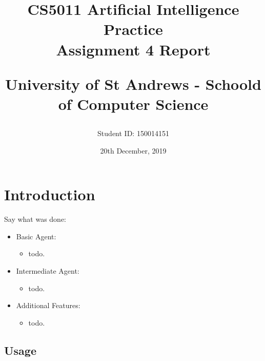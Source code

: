 \documentclass[letterpaper,12pt]{article}
\begin{document}
\title{
    CS5011 Artificial Intelligence Practice\\Assignment 4 Report\\
    \begin{large}
    University of St Andrews - Schoold of Computer Science
    \end{large}
}
\author{Student ID: 150014151}
\date{20th December, 2019}
\maketitle
\newpage

\tableofcontents
\newpage



\section{Introduction}
\label{sec:introduction}

Say what was done:

\begin{itemize}
    \item Basic Agent:
    \begin{itemize}
        \item todo.
    \end{itemize}
    \item Intermediate Agent:
    \begin{itemize}
        \item todo.
    \end{itemize}
    \item Additional Features:
    \begin{itemize}
        \item todo.
    \end{itemize}
        
\end{itemize}

\subsection{Usage}
\end{document}
